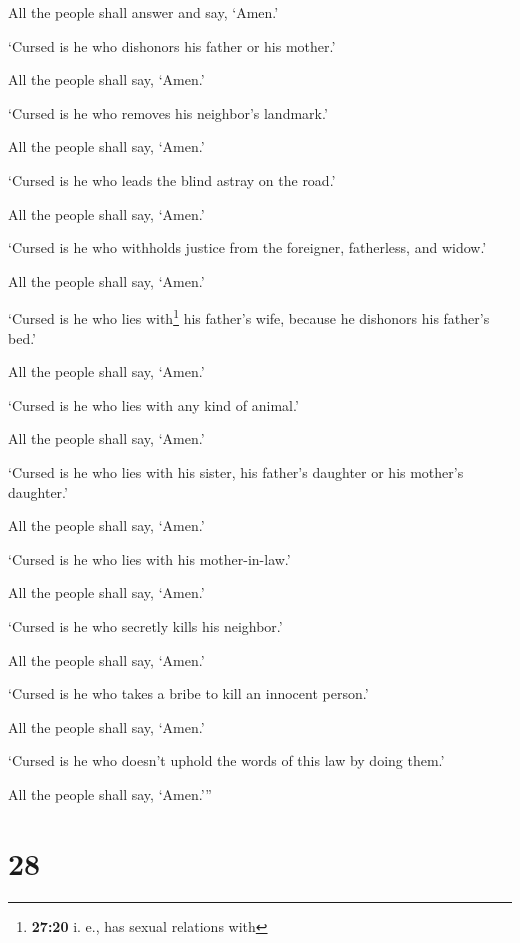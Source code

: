All the people shall answer and say, `Amen.'

 `Cursed is he who dishonors his father or his mother.'

All the people shall say, `Amen.'

 `Cursed is he who removes his neighbor's landmark.'

All the people shall say, `Amen.'

 `Cursed is he who leads the blind astray on the road.'

All the people shall say, `Amen.'

 `Cursed is he who withholds justice from the foreigner,
fatherless, and widow.'

All the people shall say, `Amen.'

 `Cursed is he who lies with\footnote{\textbf{27:20} i.
  e., has sexual relations with} his father's wife, because he dishonors
his father's bed.'

All the people shall say, `Amen.'

 `Cursed is he who lies with any kind of animal.'

All the people shall say, `Amen.'

 `Cursed is he who lies with his sister, his father's
daughter or his mother's daughter.'

All the people shall say, `Amen.'

 `Cursed is he who lies with his mother-in-law.'

All the people shall say, `Amen.'

 `Cursed is he who secretly kills his neighbor.'

All the people shall say, `Amen.'

 `Cursed is he who takes a bribe to kill an innocent
person.'

All the people shall say, `Amen.'

 `Cursed is he who doesn't uphold the words of this law
by doing them.'

All the people shall say, `Amen.'''

\hypertarget{section-27}{%
\section{28}\label{section-27}}

